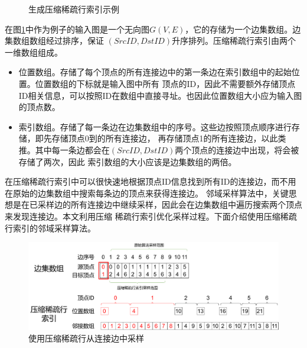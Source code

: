 \documentclass[master]{thesis-uestc}
\begin{document}
\begin{figure}
    \caption{生成压缩稀疏行索引示例}
    \label{fig:gen-csr}
\end{figure}
    在图\ref{fig:gen-csr}中作为例子的输入图是一个无向图$G(V,E)$，它的存储为一个边集数组。边集数组数组经过排序，保证
$(SrcID,DstID)$升序排列。压缩稀疏行索引由两个一维数组组成。
\begin{itemize}
    \item 位置数组。存储了每个顶点的所有连接边中的第一条边在索引数组中的起始位置。位置数组的下标就是输入图中所有
    顶点的ID，因此不需要额外存储顶点ID相关信息，可以按照ID在数组中直接寻址。也因此位置数组大小应为输入图的顶点数。
    \item 索引数组。存储了每一条边在边集数组中的序号。这些边按照顶点顺序进行存储，即先存储顶点0到的所有连接边，
    再存储顶点1的所有连接边，以此类推。其中每一条边都会在$(SrcID,DstID)$两个顶点的连接边中出现，将会被存储了两次，因此
    索引数组的大小应该是边集数组的两倍。
\end{itemize}
    在压缩稀疏行索引中可以很快速地根据顶点ID信息找到所有ID的连接边，而不用在原始的边集数组中搜索每条边的顶点来获得连接边。
邻域采样算法中，关键思想是在已采样边的所有连接边中继续采样，因此会在边集数组中遍历搜索两个顶点来发现连接边。本文利用压缩
稀疏行索引优化采样过程。下面介绍使用压缩稀疏行索引的邻域采样算法。

\begin{figure}
    \includegraphics[width=.7\linewidth]{pic/sample_use_csr.pdf}
    \caption{使用压缩稀疏行从连接边中采样}
    \label{fig:samp_use_csr}
\end{figure}
\end{document}
